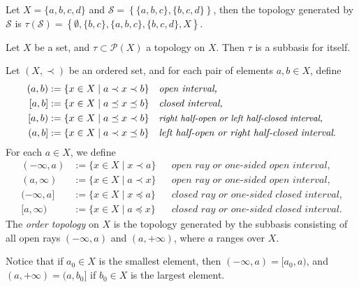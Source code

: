 \begin{exmp}\label{exmp:subbasis}
	Let $X = \{a, b, c, d\}$ and $\mathscr S = \left\{ \{a, b, c\}, \{b, c, d\} \right\}$, then the topology generated by $\mathscr S$ is $\tau(\mathscr S) = \left\{ \emptyset, \{b, c\}, \{a, b, c\}, \{b, c, d\}, X \right\}$.
\end{exmp}

\begin{exmp}
	Let $X$ be a set, and $\tau\subset \mathscr P(X)$ a topology on $X$. Then $\tau$ is a subbasis for itself.
\end{exmp}

\begin{defn}\label{defn:order_topology}
	Let $(X, \prec)$ be an ordered set, and for each pair of elements $a, b\in X$, define
	\begin{align*}
		(a, b) &:= \{x\in X\mid a \prec x \prec b\} &&\textit{open interval,}
		\\ [a, b] &:= \{x\in X \mid a \preceq x \preceq b \} && \textit{closed interval,}
		\\ [a, b) &:= \{x\in X\mid a \preceq x\prec b \} && \small\textit{right half-open or left half-closed interval}\normalsize,
		\\ (a, b] &:= \{x\in X\mid a \prec x\preceq b \} && \textit{left half-open or right half-closed interval}.
	\end{align*}
	For each $a\in X$, we define
	\begin{align*}
		(-\infty, a) &:= \{x\in X \mid x \prec a\} && \textit{open ray or one-sided open interval,}
		\\ (a, \infty) &:= \{x\in X \mid a \prec x\} && \textit{open ray or one-sided open interval,}
		\\ (-\infty, a] &:= \{x\in X \mid x \preceq a\} && \textit{closed ray or one-sided closed interval,}
		\\ [a, \infty) &:= \{x\in X\mid a \preceq x \} && \textit{closed ray or one-sided closed interval.}
	\end{align*}
	The \textit{order topology} on $X$ is the topology generated by the subbasis consisting of all open rays $(-\infty, a)$ and $(a, +\infty)$, where $a$ ranges over $X$.
\end{defn}

\begin{remark}
	Notice that if $a_0\in X$ is the smallest element, then $(-\infty, a) = [a_0, a)$, and $ (a, +\infty) = (a, b_0]$ if $b_0\in X$ is the largest element.
\end{remark}

